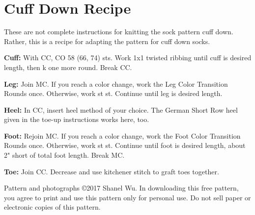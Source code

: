 \documentclass[12pt]{article}
\newcommand{\rowDir}[1]{\textbf{#1:}} %
\newenvironment{frnote}
    {%
    	\setlength{\FrameRule}{1.5pt}
    	\def\FrameCommand{\fboxrule=\FrameRule\fboxsep=\FrameSep \fcolorbox{framecolor}{shadecolor}}
    	\MakeFramed {\FrameRestore}}
    {\setlength{\FrameRule}{1pt}
	\endMakeFramed}
\begin{document}
\begin{frnote} \vspace{-1em}
\section*{Cuff Down Recipe}

These are not complete instructions for knitting the sock pattern cuff down. Rather, this is a recipe for adapting the pattern for cuff down socks. 

\vspace{1em}

\rowDir{Cuff} With CC, CO 58 (66, 74) sts. Work 1x1 twisted ribbing until cuff is desired length, then k one more round. Break CC.

\rowDir{Leg} Join MC. If you reach a color change, work the Leg Color Transition Rounds once. Otherwise, work st st. Continue until leg is desired length.

\rowDir{Heel} In CC, insert heel method of your choice. The German Short Row heel given in the toe-up instructions works here, too.

\rowDir{Foot} Rejoin MC. If you reach a color change, work the Foot Color Transition Rounds once. Otherwise, work st st. Continue until foot is desired length, about 2" short of total foot length. Break MC.

\rowDir{Toe} Join CC. Decrease and use kitchener stitch to graft toes together.

\end{frnote}

\vfill \ssmall
Pattern and photographs \copyright 2017 Shanel Wu. In downloading this free pattern, you agree to print and use this pattern only for personal use. Do not sell paper or electronic copies of this pattern.

\end{document}
